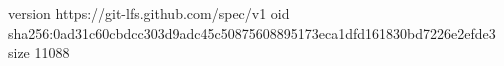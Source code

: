 version https://git-lfs.github.com/spec/v1
oid sha256:0ad31c60cbdcc303d9adc45c50875608895173eca1dfd161830bd7226e2efde3
size 11088
